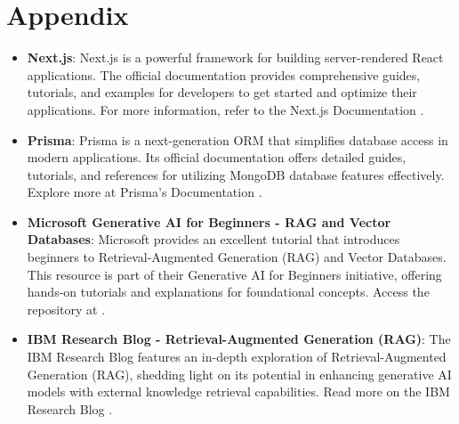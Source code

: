 
\chapter*{Appendix} 

\label{Appendix} 

\begin{itemize}
    \item \textbf{Next.js}: Next.js is a powerful framework for building server-rendered React applications. The official documentation provides comprehensive guides, tutorials, and examples for developers to get started and optimize their applications. For more information, refer to the Next.js Documentation \cite{nextjs2024}.
    \item \textbf{Prisma}: Prisma is a next-generation ORM that simplifies database access in modern applications. Its official documentation offers detailed guides, tutorials, and references for utilizing MongoDB database features effectively. Explore more at Prisma's Documentation \cite{prisma2024}.
    \item \textbf{Microsoft Generative AI for Beginners - RAG and Vector Databases}: Microsoft provides an excellent tutorial that introduces beginners to Retrieval-Augmented Generation (RAG) and Vector Databases. This resource is part of their Generative AI for Beginners initiative, offering hands-on tutorials and explanations for foundational concepts. Access the repository at \cite{msrag2024}.
    \item \textbf{IBM Research Blog - Retrieval-Augmented Generation (RAG)}: The IBM Research Blog features an in-depth exploration of Retrieval-Augmented Generation (RAG), shedding light on its potential in enhancing generative AI models with external knowledge retrieval capabilities. Read more on the IBM Research Blog \cite{ibmrag2024}.
\end{itemize}